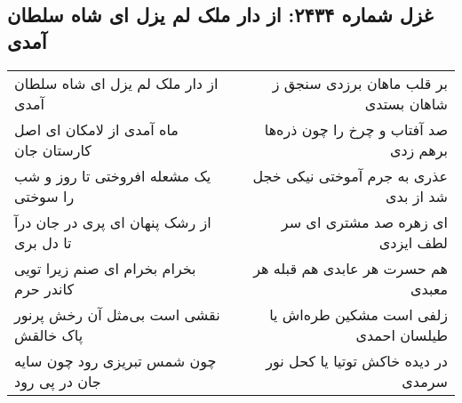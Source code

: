 \begin{center}
\section*{غزل شماره ۲۴۳۴: از دار ملک لم یزل ای شاه سلطان آمدی}
\label{sec:2434}
\begin{longtable}{l p{0.5cm} r}
از دار ملک لم یزل ای شاه سلطان آمدی
&&
بر قلب ماهان برزدی سنجق ز شاهان بستدی
\\
ماه آمدی از لامکان ای اصل کارستان جان
&&
صد آفتاب و چرخ را چون ذره‌ها برهم زدی
\\
یک مشعله افروختی تا روز و شب را سوختی
&&
عذری به جرم آموختی نیکی خجل شد از بدی
\\
از رشک پنهان ای پری در جان درآ تا دل بری
&&
ای زهره صد مشتری ای سر لطف ایزدی
\\
بخرام بخرام ای صنم زیرا تویی کاندر حرم
&&
هم حسرت هر عابدی هم قبله هر معبدی
\\
نقشی است بی‌مثل آن رخش پرنور پاک خالقش
&&
زلفی است مشکین طره‌اش یا طیلسان احمدی
\\
چون شمس تبریزی رود چون سایه جان در پی رود
&&
در دیده خاکش توتیا یا کحل نور سرمدی
\\
\end{longtable}
\end{center}
